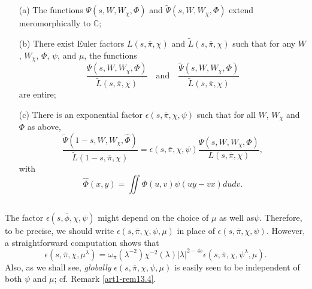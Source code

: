 \setcounter{theorem}{2}
\begin{theorem}\label{art1-thm5.3}
\begin{itemize}
\item[(a)] The functions $\Psi(s,W,W_{\chi},\Phi)$ and $\widetilde{\Psi}(s,W,W_{\chi},\Phi)$ extend meromorphically to $\mathbb{C}$;

\item[(b)] There exist Euler factors $L(s,\overline{\pi},\chi)$ and $\widetilde{L}(s,\overline{\pi},\chi)$ such that for any $W$, $W_{\chi}$, $\Phi$, $\psi$, and $\mu$, the functions
$$
\frac{\Psi(s,W,W_{\chi},\Phi)}{\widetilde{L}(s,\overline{\pi},\chi)}\quad\text{and}\quad \dfrac{\widetilde{\Psi}(s,W,W_{\chi},\Phi)}{\widetilde{L}(s,\overline{\pi},\chi)}
$$
are entire;

\item[(c)] There is an exponential factor $\epsilon(s,\overline{\pi},\chi,\psi)$ such that for all $W$, $W_{\chi}$ and $\Phi$ as above,
\setcounter{subsection}{3}
\setcounter{equation}{0}
\begin{equation}
\dfrac{\widetilde{\Psi}(1-s,W,W_{\chi},\widehat{\Phi})}{\widetilde{L}(1-s,\overline{\pi},\chi)}=\epsilon(s,\overline{\pi},\chi,\psi)\dfrac{\Psi(s,W,W_{\chi},\Phi)}{L(s,\overline{\pi},\chi)},\label{art1-eq5.3.1}
\end{equation}
with
$$
\widehat{\Phi}(x,y)=\iint \Phi (u,v)\psi(uy-vx)dudv.
$$
\end{itemize}
\end{theorem}

\setcounter{subsection}{3}
\subsection{}\label{art1-sec5.4}
The factor $\epsilon(s,\overline{\phi},\chi,\psi)$ might depend on the choice of $\mu$ as well as\pageoriginale $\psi$. Therefore, to be precise, we should write $\epsilon(s,\overline{\pi},\chi,\psi,\mu)$ in place of $\epsilon(s,\overline{\pi},\chi,\psi)$. However, a straightforward computation shows that
\setcounter{equation}{0}
\begin{equation}
\epsilon(s,\overline{\pi},\chi,\mu^{\lambda})=\omega_{\overline{\pi}}(\lambda^{-2})\chi^{-2}(\lambda)|\lambda|^{2-4s}\epsilon (s,\overline{\pi},\chi,\psi^{\lambda},\mu).\label{art1-eq5.4.1}
\end{equation}
Also, as we shall see, {\em globally} $\epsilon(s,\overline{\pi},\chi,\psi,\mu)$ is easily seen to be independent of both $\psi$ and $\mu$; cf. Remark \ref{art1-rem13.4}.

